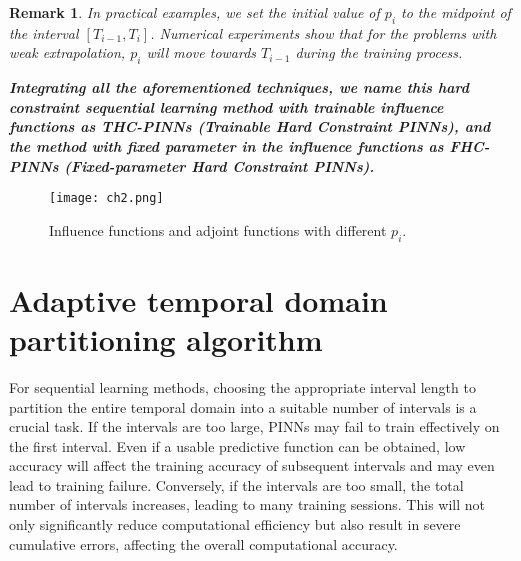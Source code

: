 \documentclass[preprint]{elsarticle}
\newtheorem{remark}{Remark}
\numberwithin{table}{section}
\numberwithin{equation}{section}
\numberwithin{figure}{section}
\begin{document}
\begin{CJK}{UTF8}{gbsn}
\begin{remark}
In practical examples, we set the initial value of $p_{i}$ to the midpoint of the interval $[T_{i-1},T_{i}]$. Numerical experiments show  that for the problems with weak extrapolation, $p_{i}$ will move towards $T_{i-1}$
  during the training process. 
  \end{remark}
  
\textbf{\textit{ Integrating all the aforementioned techniques, we name this hard constraint sequential learning method with trainable influence functions as THC-PINNs (Trainable Hard Constraint  PINNs), and
the method with fixed parameter in the influence functions as FHC-PINNs (Fixed-parameter
Hard Constraint PINNs). 
}}
  
\begin{figure}[htbp]
    \centering
\texttt{[image: ch2.png]}
\caption{Influence functions and adjoint functions with different $p_i$.}
\label{fig:lambda-eta-pq}
\end{figure} 




\section{Adaptive temporal domain partitioning algorithm }\label{sec3}

  

For sequential learning methods, choosing the appropriate interval length to partition the entire temporal domain  into a suitable number of intervals is a crucial task. If the intervals are too large, PINNs may fail to train effectively   on the first interval. Even if a usable predictive function can be  obtained, low accuracy will affect the training accuracy of subsequent intervals and may even lead to training failure. Conversely, if the intervals are too small, the total number of intervals increases, leading to many training sessions. This will not only significantly reduce computational efficiency but also result in severe cumulative errors, affecting the overall computational accuracy.


 


\end{CJK}
\end{document}
